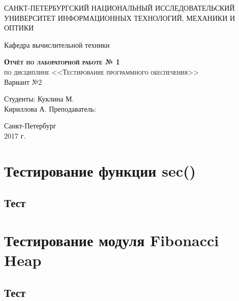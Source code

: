 \documentclass[a4paper,10pt]{article}
\begin{document}
    \begin{titlepage}
        \begin{center}
            \large
            САНКТ-ПЕТЕРБУРГСКИЙ НАЦИОНАЛЬНЫЙ ИССЛЕДОВАТЕЛЬСКИЙ УНИВЕРСИТЕТ ИНФОРМАЦИОННЫХ ТЕХНОЛОГИЙ, МЕХАНИКИ И ОПТИКИ \\


            \vspace{3cm}


            Кафедра вычислительной техники
            \vspace{4cm}

            \textsc{ \textbf{Отчёт по лабораторной работе  № 1} \\
            по дисциплине <<Тестирование программного обеспечения>>\\}
            Вариант №2\\[8mm]

            \bigskip
        \end{center}
        \vspace{3cm}

        \hfill\begin{flushright}
             Студенты: Куклина М. \\ Кириллова А. 
             \vfill
             Преподаватель:
        \end{flushright}
        \vfill
        \vfill
        \vfill
        \vfill
        \vfill
        \begin{center}
            Санкт-Петербург \\2017 г.
        \end{center}
    \end{titlepage}
\newpage

\section*{Тестирование функции sec()}
	\subsection*{Тест}
        

\section*{Тестирование модуля Fibonacci Heap}
	\subsection*{Тест}
        
\newpage
\end{document}
